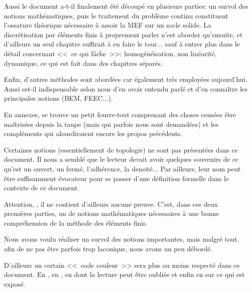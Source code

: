 \documentclass[11pt,pdflatex]{book}
\begin{document}
Aussi le document a-t-il finalement été découpé en plusieurs parties:
un survol des notions mathématiques, puis le traitement du problème
continu constituent l'ossature théorique nécessaire à assoir la MEF
sur un socle solide. La discrétisation par éléments finis à proprement parler
n'est aborder qu'ensuite, et d'ailleurs un seul chapitre suffirait à en faire
le tour... sauf à entrer plus dans le détail concernant <<~ce qui fâche~>>:
homogénéisation, non linéarité, dynamique, ce qui est fait dans des
chapitres séparés.

\medskip
Enfin, d'autres méthodes sont abordées car également très
employées aujourd'hui. Aussi est-il indispensable selon nous d'en avoir 
entendu parlé et d'en connaître les principales notions (BEM, FEEC...).

\medskip
En annexes, se trouve un petit fourre-tout comprenant des choses censées être 
maîtrisées depuis la taupe (mais qui parfois nous sont demandées) et les
compléments qui alourdiraient encore les propos précédents.

\medskip
Certaines notions (essentiellement de topologie) ne sont pas présentées dans ce 
document.
Il nous a semblé que le lecteur devait avoir quelques souvenirs de ce qu'est un
ouvert, un fermé, l'adhérence, la densité...
Par ailleurs, leur nom peut être suffisamment évocateur pour se passer d'une
définition formelle dans le contexte de ce document.

\bigskip
Attention, , il ne contient
d'ailleurs aucune preuve.
C'est, dans ces deux premières parties, un  de 
notions mathématiques nécessaires à une bonne compréhension de la méthode des éléments finis.

Nous avons voulu réaliser un survol des notions importantes, mais malgré tout, afin de ne
pas être parfois trop laconique, nous avons un peu débordé. \ifVersionDuDocEstVincent{}\fi

\medskip
\ifVersionDuDocEstVincent
D'ailleurs un certain <<~code couleur~>> sera plus ou moins respecté dans ce document.
En , en ,
en  dont la lecture peut être
oubliée et enfin en
 sur ce qui est exposé.
\fi
\end{document}
